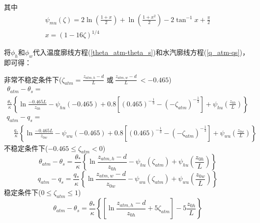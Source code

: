 \noindent 其中
\begin{equation}\label{Psim}
\begin{array}{c}\psi_{mu}\left(\zeta\right)=2\ln{(\frac{1+x}{2})}+\ln{\left(\frac{1+x^2}{2}\right)-2}\tan^{-1}{x}+\frac{\pi}{2} \\
      x={(1-16\zeta)}^{1/4}\end{array}
\end{equation}

将$\phi_h$和$\phi_w$代入温度廓线方程(\ref{theta_atm-theta_s})和水汽廓线方程(\ref{q_atm-qs})，即可得：

\noindent 非常不稳定条件下($\zeta_{atm}=\frac{z_{atm,h}-d}{L}$ 或$ \ \frac{z_{atm,w}-d}{L}\ <-0.465$)
\begin{equation}\label{theta_VU}
\begin{array}{l}\theta_{atm}-\theta_{s}= \\ 
     \frac{\theta_{*}}{\kappa}\left\{\ln \frac{-0.465 L}{z_{0 h}}-\psi_{hu}(-0.465)+0.8\left[(0.465)^{-\frac{1}{3}}-\left(-\zeta_{atm}\right)^{-\frac{1}{3}}\right]
     +\psi_{hu}\left(\frac{z_{0 h}}{L}\right)\right\}\end{array}
\end{equation}
\begin{equation}\label{q_VU}
\begin{array}{l}q_{atm}-q_{s}= \\ 
     \quad \frac{q_{*}}{\kappa}\left\{\ln \frac{-0.465 L}{z_{0 w}}-\psi_{wu}(-0.465)+0.8\left[(0.465)^{-\frac{1}{3}}-
     \left(-\zeta_{atm}\right)^{-\frac{1}{3}}\right]+\psi_{wu}\left(\frac{z_{0 w}}{L}\right)\right\}\end{array}
\end{equation}
不稳定条件下($-0.465\le\zeta_{atm}<0$)
\begin{equation}
\theta_{atm}-\theta_{s}=\frac{\theta_{*}}{\kappa}\left\{\ln \frac{z_{atm, h}-d}{z_{0 h}}-\psi_{hu}
\left(\zeta_{atm}\right)+\psi_{hu}\left(\frac{z_{0 h}}{L}\right)\right\}
\end{equation}
\begin{equation}
q_{atm}-q_{s}=\frac{q_{*}}{\kappa}\left\{\ln \frac{z_{atm, w}-d}{z_{0 w}}-
\psi_{wu}\left(\zeta_{atm}\right)+\psi_{wu}\left(\frac{z_{0 w}}{L}\right)\right\}
\end{equation}
稳定条件下($0\le\zeta_{atm}\le1$)
\begin{equation}
\theta_{atm}-\theta_{s}=\frac{\theta_{*}}{\kappa}\left\{\left[\ln \frac{z_{atm, h}-d}{z_{0 h}}+5 \zeta_{atm}\right]-5 \frac{z_{0 h}}{L}\right\}
\end{equation}

